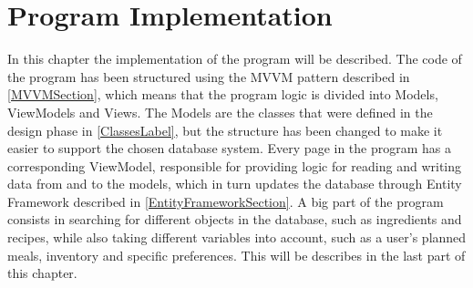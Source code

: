 \chapter{Program Implementation}
In this chapter the implementation of the program will be described. The code of the program has been structured using the MVVM pattern described in \cref{MVVMSection}, which means that the program logic is divided into Models, ViewModels and Views. The Models are the classes that were defined in the design phase in \cref{ClassesLabel}, but the structure has been changed to make it easier to support the chosen database system.
Every page in the program has a corresponding ViewModel, responsible for providing logic for reading and writing data from and to the models, which in turn updates the database through Entity Framework described in \cref{EntityFrameworkSection}.
A big part of the program consists in searching for different objects in the database, such as ingredients and recipes, while also taking different variables into account, such as a user's planned meals, inventory and specific preferences. This will be describes in the last part of this chapter.